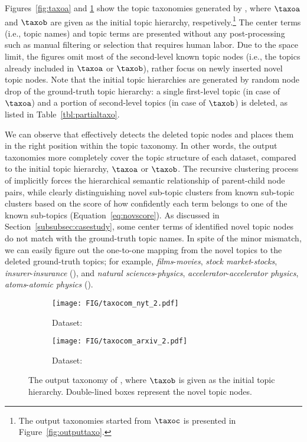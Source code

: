 Figures~\ref{fig:taxoa} and \ref{fig:taxob} show the topic taxonomies generated by \proposed, where $\taxoa$ and $\taxob$ are given as the initial topic hierarchy, respetively.\footnote{The output taxonomies started from $\taxoc$ is presented in Figure~\ref{fig:outputtaxo}.}
The center terms (i.e., topic names) and topic terms are presented without any post-processing such as manual filtering or selection that requires human labor.
Due to the space limit, the figures omit most of the second-level known topic nodes (i.e., the topics already included in $\taxoa$ or $\taxob$), rather focus on newly inserted novel topic nodes.
Note that the initial topic hierarchies are generated by random node drop of the ground-truth topic hierarchy:
a single first-level topic (in case of $\taxoa$) and a portion of second-level topics (in case of $\taxob$) is deleted, as listed in Table~\ref{tbl:partialtaxo}.

We can observe that \proposed effectively detects the deleted topic nodes and places them in the right position within the topic taxonomy.
In other words, the output taxonomies more completely cover the topic structure of each dataset, compared to the initial topic hierarchy, $\taxoa$ or $\taxob$.
The recursive clustering process of \proposed implicitly forces the hierarchical semantic relationship of parent-child node pairs, while clearly distinguishing novel sub-topic clusters from known sub-topic clusters based on the score of how confidently each term belongs to one of the known sub-topics (Equation~\ref{eq:novscore}).
As discussed in Section~\ref{subsubsec:casestudy}, some center terms of identified novel topic nodes do not match with the ground-truth topic names.
In spite of the minor mismatch, we can easily figure out the one-to-one mapping from the novel topics to the deleted ground-truth topics; 
for example, \textit{films}-\textit{movies}, \textit{stock market}-\textit{stocks}, \textit{insurer}-\textit{insurance} (\nyt), and \textit{natural sciences}-\textit{physics}, \textit{accelerator}-\textit{accelerator physics}, \textit{atoms}-\textit{atomic physics} (\arxiv).

\begin{figure}[t]
\centering
\begin{subfigure}{\linewidth}
    \centering
    \texttt{[image: FIG/taxocom\_nyt\_2.pdf]}  
    \caption{Dataset: \nyt}
\end{subfigure}
\begin{subfigure}{\linewidth}
    \centering
    \texttt{[image: FIG/taxocom\_arxiv\_2.pdf]}
    \caption{Dataset: \arxiv}
\end{subfigure}
\caption{The output taxonomy of \proposed, where $\taxob$ is given as the initial topic hierarchy. Double-lined boxes represent the novel topic nodes.}
\label{fig:taxob}
\end{figure}

